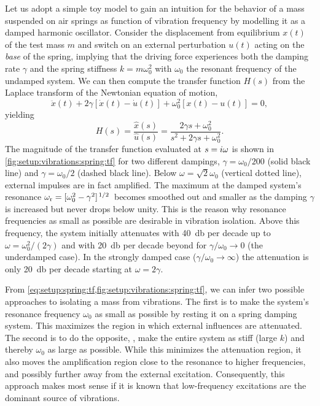 Let us adopt a simple toy model to gain an intuition for the behavior of a mass suspended on air springs as function of vibration frequency by modelling it as a damped harmonic oscillator.
Consider the displacement from equilibrium $x(t)$ of the test mass $m$ and switch on an external perturbation $u(t)$ acting on the \emph{base} of the spring, implying that the driving force experiences both the damping rate $\gamma$ and the spring stiffness $k=m\omega_0^2$ with $\omega_0$ the resonant frequency of the undamped system.
We can then compute the transfer function $H(s)$ from the Laplace transform of the Newtonian equation of motion,
\begin{equation}\label{eq:setup:spring:eom}
    \ddot{x}(t) + 2\gamma[\dot{x}(t)-\dot{u}(t)] + \omega_0^2 [x(t)-u(t)] = 0,
\end{equation}
yielding
\begin{equation}\label{eq:setup:spring:tf}
    H(s) = \frac{\hat{x}(s)}{\hat{u}(s)} = \frac{2\gamma s + \omega_0^2}{s^2 + 2\gamma s + \omega_0^2}.
\end{equation}
The magnitude of the transfer function evaluated at $s=i\omega$ is shown in \cref{fig:setup:vibrations:spring:tf} for two different dampings, $\gamma = \omega_0/200$ (solid black line) and $\gamma = \omega_0/2$ (dashed black line).
Below $\omega=\sqrt{2}\omega_0$ (vertical dotted line), external impulses are in fact amplified.
The maximum at the damped system's resonance $\omega_{\mr{r}} = [\omega_0^2 - \gamma^2]^{\flatfrac{1}{2}}$ becomes smoothed out and smaller as the damping $\gamma$ is increased but never drops below unity.
This is the reason why resonance frequencies as small as possible are desirable in vibration isolation.
Above this frequency, the system initially attenuates with \qty{40}{\decibel} per decade up to $\omega=\omega_0^2/(2\gamma)$ and with \qty{20}{\decibel} per decade beyond for $\gamma/\omega_0\to 0$ (the underdamped case).
In the strongly damped case ($\gamma/\omega_0\to\infty$) the attenuation is only \qty{20}{\decibel} per decade starting at $\omega = 2\gamma$.

From \cref{eq:setup:spring:tf,fig:setup:vibrations:spring:tf}, we can infer two possible approaches to isolating a mass from vibrations.
The first is to make the system's resonance frequency $\omega_0$ as small as possible by resting it on a spring damping system.
This maximizes the region in which external influences are attenuated.
The second is to do the opposite, \ie, make the entire system as stiff (large $k$) and thereby $\omega_0$ as large as possible.
While this minimizes the attenuation region, it also moves the amplification region close to the resonance to higher frequencies, and possibly further away from the external excitation.
Consequently, this approach makes most sense if it is known that low-frequency excitations are the dominant source of vibrations.

